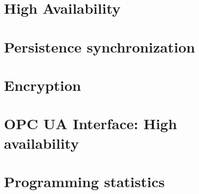 \section{High Availability}\label{sec:res:ha}

\section{Persistence synchronization}\label{sec:res:psync}

\section{Encryption}\label{sec:res:security}

\section{OPC UA Interface: High availability}\label{sec:res:opc-ua}


\section{Programming statistics}
